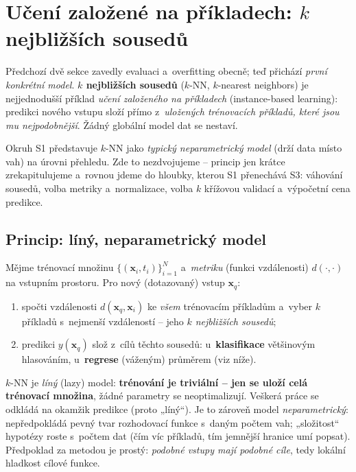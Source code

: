 \section{Učení založené na příkladech: $k$ nejbližších sousedů}\label{sec:knn}

Předchozí dvě sekce zavedly evaluaci a~overfitting obecně; teď přichází \emph{první konkrétní model}. \textbf{$k$ nejbližších sousedů} ($k$-NN, $k$-nearest neighbors) je nejjednodušší příklad \emph{učení založeného na příkladech} (instance-based learning): predikci nového vstupu složí přímo z~\emph{uložených trénovacích příkladů, které jsou mu nejpodobnější}. Žádný globální model dat se nestaví.

\begin{poznamka}[Vztah k~S1]
Okruh S1 představuje $k$-NN jako \emph{typický neparametrický model} (drží data místo vah) na úrovni přehledu. Zde to nezdvojujeme -- princip jen krátce zrekapitulujeme a~rovnou jdeme do hloubky, kterou S1 přenechává S3: váhování sousedů, volba metriky a~normalizace, volba $k$ křížovou validací a~výpočetní cena predikce.
\end{poznamka}

\subsection{Princip: líný, neparametrický model}

\begin{definice}
Mějme trénovací množinu $\{(\mathbf{x}_i,t_i)\}_{i=1}^N$ a~\emph{metriku} (funkci vzdálenosti) $d(\cdot,\cdot)$ na vstupním prostoru. Pro nový (dotazovaný) vstup $\mathbf{x}_q$:
\begin{enumerate}
  \item spočti vzdálenosti $d(\mathbf{x}_q,\mathbf{x}_i)$ ke \emph{všem} trénovacím příkladům a~vyber $k$ příkladů s~nejmenší vzdáleností -- jeho \emph{$k$ nejbližších sousedů};
  \item predikci $y(\mathbf{x}_q)$ slož z~cílů těchto sousedů: u~\textbf{klasifikace} většinovým hlasováním, u~\textbf{regrese} (váženým) průměrem (viz níže).
\end{enumerate}
\end{definice}

\begin{intuice}
$k$-NN je \emph{líný} (lazy) model: \textbf{trénování je triviální -- jen se uloží celá trénovací množina}, žádné parametry se neoptimalizují. Veškerá práce se odkládá na okamžik predikce (proto „líný``). Je to zároveň model \emph{neparametrický}: nepředpokládá pevný tvar rozhodovací funkce s~daným počtem vah; „složitost`` hypotézy roste s~počtem dat (čím víc příkladů, tím jemnější hranice umí popsat). Předpoklad za metodou je prostý: \emph{podobné vstupy mají podobné cíle}, tedy lokální hladkost cílové funkce.
\end{intuice}

